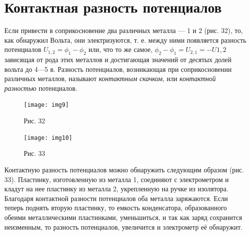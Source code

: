 \documentclass[a4paper,10pt]{book}
\begin{document}
\section{Контактная разность потенциалов} 
Если привести в соприкосновение два различных металла — 1 и 2 (рис. 32), то, как обнаружил Вольта, они электризуются, т. е. между ними появляется разность потенциалов $U_{1,2} = \phi_1 - \phi_2$ или, что то же самое, $\phi_2 - \phi_1 = U_{2,1} = -U{1,2}$ зависящая от рода этих металлов и достигающая значений от десятых долей вольта до 4—5 в. Разность потенциалов, возникающая при соприкосновении различных металлов, называют \emph{контактным скачком}, или \emph{контактной разностью} потенциалов. 
\begin{figure}[h]
\texttt{[image: img9]}
\caption{Рис. 32}
\label{img9}
\end{figure}
\begin{figure}[h]
\texttt{[image: img10]}
\caption{Рис. 33}
\label{img10}
\end{figure}
Контактную разность потенциалов можно обнаружить следующим образом (рис. 33). Пластинку, изготовленную из металла 1, соединяют с электрометром и кладут на нее пластинку из металла 2, укрепленную на ручке из изолятора. Благодаря контактной разности потенциалов оба металла заряжаются. Если теперь поднять вторую пластинку, то емкость конденсатора, образованного обеими металлическими пластинками, уменьшиться, и так как заряд сохранится неизменным, то разность потенциалов, увеличится и электрометр её обнаружит.
\end{document}
